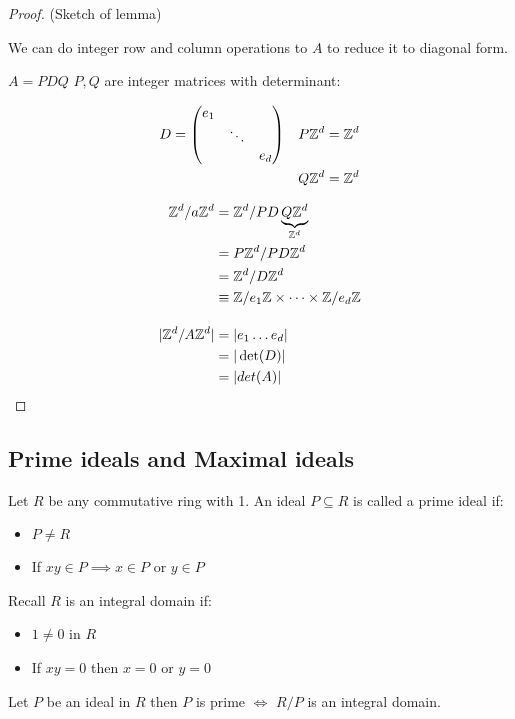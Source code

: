 \documentclass[11pt]{article}
\begin{document}
\begin{proof}
	(Sketch of lemma)

	We can do integer row and column operations to $A$ to reduce it to diagonal form.
	\spa

	$A = PDQ$ \hspace{7pt} $P,Q$ are integer matrices with determinant:

	\begin{align*}
		D = \begin{pmatrix}
			e_1&&\\
			&\ddots&\\
			&&e_d
		\end{pmatrix} && P\mathbb{Z}^d &= \mathbb{Z}^d\\
		&& Q\mathbb{Z}^d &= \mathbb{Z}^d
	\end{align*}

	\begin{align*}
		\mathbb{Z}^d / a\mathbb{Z}^d & = \mathbb{Z}^d / PD\underbrace{Q \mathbb{Z}^d}_{\mathbb{Z}^d}\\
		&= P\mathbb{Z}^d/ PD\mathbb{Z}^d\\
		&= \mathbb{Z}^d / D\mathbb{Z}^d\\
		&\equiv \mathbb{Z}/e_1\mathbb{Z} \times \dots \times \mathbb{Z}/e_d\mathbb{Z}\\[1em]
		|\mathbb{Z}^d / A\mathbb{Z}^d | &= |e_1 \dots e_d|\\
		&=|\det(D)|\\
		&= |det(A)|
	\end{align*}
\end{proof}

\subsection{Prime ideals and Maximal ideals}

Let $R$ be any commutative ring with 1.
An ideal $P \subseteq R$ is called a prime ideal if:

\begin{itemize}
	\item{$P\neq R$}
	\item{If $xy \in P \implies x \in P $ or $y \in P$}
\end{itemize}
\spa
Recall $R$ is an integral domain if:
\begin{itemize}
	\item{$1 \neq 0 $ in $R$}
	\item{If $xy = 0 $ then $x= 0$ or $y=0$}
\end{itemize}


\begin{prop}
Let $P$ be an ideal in $R$ then $P$ is prime $\iff$ $R/P$ is an integral domain.
\end{prop}
\end{document}
